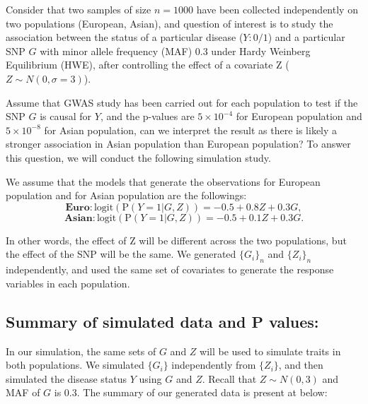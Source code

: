 \documentclass[
]{article}
\begin{document}
Consider that two samples of size \(n=1000\) have been collected
independently on two populations (European, Asian), and question of
interest is to study the association between the status of a particular
disease (\(Y:0/1\)) and a particular SNP \(G\) with minor allele
frequency (MAF) \(0.3\) under Hardy Weinberg Equilibrium (HWE), after
controlling the effect of a covariate Z (\(Z\sim N(0,\sigma=3)\)).

Assume that GWAS study has been carried out for each population to test
if the SNP \(G\) is causal for \(Y\), and the p-values are
\(5\times10^{-4}\) for European population and \(5 \times 10^{-8}\) for
Asian population, can we interpret the result as there is likely a
stronger association in Asian population than European population? To
answer this question, we will conduct the following simulation study.

We assume that the models that generate the observations for European
population and for Asian population are the followings:
\[\textbf{Euro}:\text{logit}(\text{P}(Y=1|G,Z)) = -0.5 + 0.8Z + 0.3G,\]
\[\textbf{Asian}: \text{logit}(\text{P}(Y=1|G,Z)) = -0.5 + 0.1Z + 0.3G.\]

In other words, the effect of Z will be different across the two
populations, but the effect of the SNP will be the same. We generated
\(\{G_i\}_n\) and \(\{Z_i\}_n\) independently, and used the same set of
covariates to generate the response variables in each population.

\hypertarget{summary-of-simulated-data-and-p-values}{%
\subsection{Summary of simulated data and P
values:}\label{summary-of-simulated-data-and-p-values}}

In our simulation, the same sets of \(G\) and \(Z\) will be used to
simulate traits in both populations. We simulated \(\{G_i\}\)
independently from \(\{Z_i\}\), and then simulated the disease status
\(Y\) using \(G\) and \(Z\). Recall that \(Z \sim N(0,3)\) and MAF of
\(G\) is 0.3. The summary of our generated data is present at below:
\end{document}
